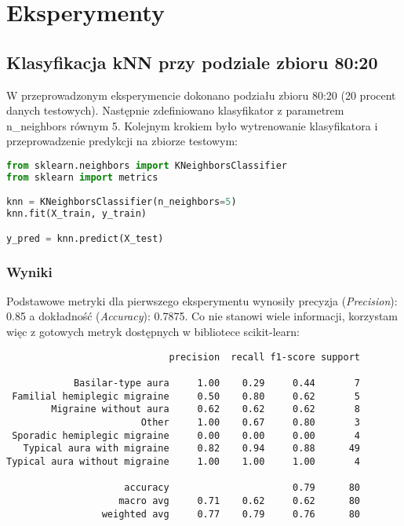 \section{Eksperymenty}
\subsection{Klasyfikacja kNN przy podziale zbioru 80:20}
W przeprowadzonym eksperymencie dokonano podziału zbioru 80:20 (20 procent danych testowych). Następnie zdefiniowano klasyfikator z parametrem n\_neighbors równym 5. Kolejnym krokiem było wytrenowanie klasyfikatora i przeprowadzenie predykcji na zbiorze testowym:\\

\begin{lstlisting}[language=Python, caption=Definicja i uzycie kNN]
from sklearn.neighbors import KNeighborsClassifier
from sklearn import metrics

knn = KNeighborsClassifier(n_neighbors=5)
knn.fit(X_train, y_train)

y_pred = knn.predict(X_test)
\end{lstlisting}

\subsubsection{Wyniki}
Podstawowe metryki dla pierwszego eksperymentu wynosiły precyzja (\textit{Precision}): 0.85 a dokładność (\textit{Accuracy}): 0.7875. Co nie stanowi wiele informacji, korzystam więc z gotowych metryk dostępnych w bibliotece scikit-learn:\\

\begin{verbatim}
                             precision  recall f1-score support

            Basilar-type aura     1.00    0.29     0.44       7
 Familial hemiplegic migraine     0.50    0.80     0.62       5
        Migraine without aura     0.62    0.62     0.62       8
                        Other     1.00    0.67     0.80       3
 Sporadic hemiplegic migraine     0.00    0.00     0.00       4
   Typical aura with migraine     0.82    0.94     0.88      49
Typical aura without migraine     1.00    1.00     1.00       4

                     accuracy                      0.79      80
                    macro avg     0.71    0.62     0.62      80
                 weighted avg     0.77    0.79     0.76      80
\end{verbatim}

